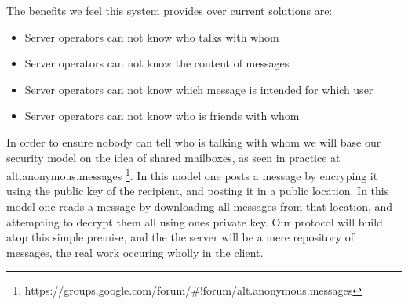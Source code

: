 The benefits we feel this system provides over current solutions are:
\begin{itemize}
\item Server operators can not know who talks with whom
\item Server operators can not know the content of messages
\item Server operators can not know which message is intended for which user
\item Server operators can not know who is friends with whom
\end{itemize}

In order to ensure nobody can tell who is talking with whom we will base our
security model on the idea of shared mailboxes, as seen in practice at
alt.anonymous.messages
\footnote{https://groups.google.com/forum/\#!forum/alt.anonymous.messages}.
In this model one posts a message by encryping it using the public key of the
recipient, and posting it in a public location. In this model one reads a
message by downloading all messages from that location, and attempting to
decrypt them all using ones private key. Our protocol will build atop this
simple premise, and the the server will be a mere repository of messages, the
real work occuring wholly in the client.
